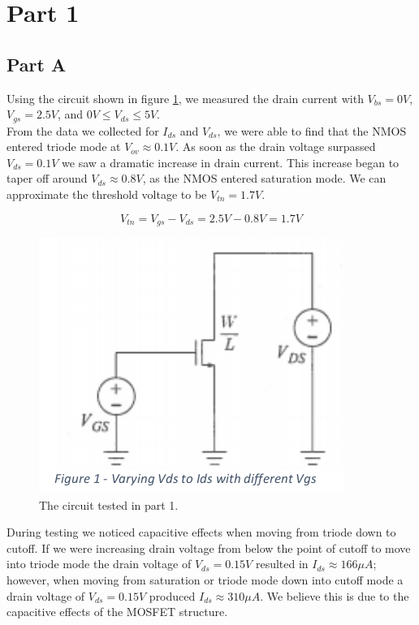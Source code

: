 \section{Part 1}
\subsection{Part A}
Using the circuit shown in figure \ref{fig:circuit1}, we measured the drain current with $V_{bs} = 0 V$, $V_{gs} = 2.5 V$, and $0V \le V_{ds} \le 5 V$.
\\
		From the data we collected for $I_{ds}$ and $V_{ds}$, we were able to find that the NMOS entered triode mode at $V_{ov} \approx 0.1 V$. 
		As soon as the drain voltage surpassed $V_{ds}=0.1 V$ we saw a dramatic increase in drain current.
		This increase began to taper off around $V_{ds}\approx0.8V$, as the NMOS entered saturation mode. 
		We can approximate the threshold voltage to be $V_{tn} = 1.7 V$.

		\begin{equation}
		\label{eq:threshold}
		V_{tn} = V_{gs} - V_{ds} = 2.5 V - 0.8 V = 1.7 V
		\end{equation}

		\FloatBarrier

		\begin{figure}[h!]
		\centering
		\includegraphics[scale=0.75]{../images/circuit1}
		\caption{The circuit tested in part 1.}
		\label{fig:circuit1}
		\end{figure}

		\FloatBarrier
		During testing we noticed capacitive effects when moving from triode down to cutoff. 
		If we were increasing drain voltage from below the point of cutoff to move into triode mode the drain voltage of $V_{ds}=0.15V$ resulted in $I_{ds}\approx 166 \mu A$;
		however, when moving from saturation or triode mode down into cutoff mode a drain voltage of $V_{ds}=0.15 V$ produced $I_{ds}\approx 310 \mu A$.
		We believe this is due to the capacitive effects of the MOSFET structure.

